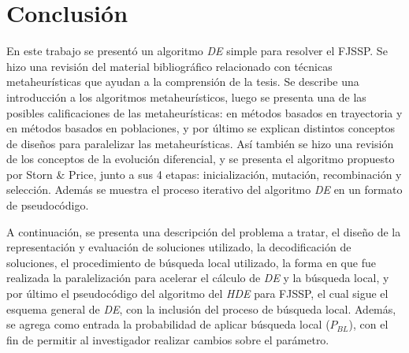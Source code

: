 \chapter{Conclusión} 
En este trabajo se presentó un algoritmo \textit{DE} simple para resolver el FJSSP. Se hizo una revisión del material bibliográfico relacionado con técnicas metaheurísticas que ayudan a la comprensión de la tesis. Se describe una introducción a los algoritmos metaheurísticos, luego se presenta una de las posibles calificaciones de las metaheurísticas: en métodos basados en trayectoria y en métodos basados en poblaciones, y por último se explican distintos conceptos de diseños para paralelizar las metaheurísticas. Así también se hizo una revisión de los conceptos de la evolución diferencial, y se presenta el algoritmo propuesto por Storn \& Price, junto a sus 4 etapas: inicialización, mutación, recombinación y selección. Además se muestra el proceso iterativo del algoritmo \textit{DE} en un formato de pseudocódigo.


A continuación, se presenta una descripción del problema a tratar, el diseño de la representación y evaluación de soluciones utilizado, la decodificación de soluciones, el procedimiento de búsqueda local utilizado, la forma en que fue realizada la paralelización para acelerar el cálculo de \textit{DE} y la búsqueda local, y por último el pseudocódigo del algoritmo del \textit{HDE} para FJSSP, el cual sigue el esquema general de \textit{DE}, con la inclusión del proceso de búsqueda local. Además, se agrega como entrada la probabilidad de aplicar búsqueda local ($P_{BL}$), con el fin de permitir al investigador realizar cambios sobre el parámetro.


